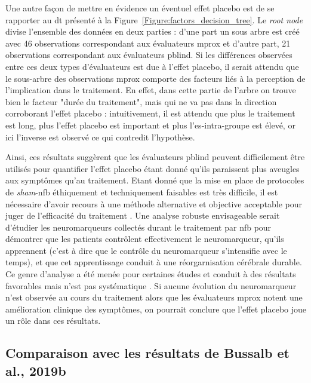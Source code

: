 Une autre façon de mettre en évidence un éventuel effet placebo est de se rapporter au \gls{dt} présenté à la Figure~\ref{Figure:factors_decision_tree}. Le 
\textit{root node} divise l'ensemble des données en deux parties : d'une part un sous arbre est créé avec 46 observations correspondant aux évaluateurs
\gls{mprox} et d'autre part, 21 observations correspondant aux évaluateurs \gls{pblind}. Si les différences observées entre ces deux types d'évaluateurs est due à l'effet
placebo, il serait attendu que le sous-arbre des observations \gls{mprox} comporte des facteurs liés à la perception de l'implication dans le traitement. En effet, dans cette
partie de l'arbre on trouve bien le facteur "durée du traitement", mais qui ne va pas dans la direction corroborant l'effet placebo : intuitivement, 
il est attendu que plus le traitement est long, plus l'effet placebo est important et plus l'\gls{es}-intra-groupe est élevé, or ici l'inverse est observé ce qui
contredit l'hypothèse. 

Ainsi, ces résultats suggèrent que les évaluateurs \gls{pblind} peuvent difficilement être utilisés pour quantifier l'effet placebo étant donné qu'ils paraissent
plus aveugles aux symptômes qu'au traitement. Etant donné que la mise en place de protocoles de \textit{sham}-\gls{nfb} éthiquement \citep{Holtmann2014} et techniquement 
\citep{Birbaumer1991} faisables est très difficile, il est nécessaire d'avoir recours à une méthode alternative et objective acceptable pour juger de l'efficacité du traitement 
\citep{World-Medical-Association2000}. Une analyse robuste envisageable serait d'étudier les neuromarqueurs collectés durant le traitement par \gls{nfb} pour démontrer que les 
patients contrôlent effectivement le neuromarqueur, qu'ils apprennent (c'est à dire que le contrôle du neuromarqueur s'intensifie avec le temps), et que cet apprentissage conduit 
à une réorgarnisation cérébrale durable. Ce genre d'analyse a été menée pour certaines études et conduit à des résultats favorables mais n'est pas 
systématique \citep{Arns2014}. Si aucune évolution du neuromarqueur n'est observée au cours du traitement alors que les évaluateurs \gls{mprox} notent une amélioration clinique 
des symptômes, on pourrait conclure que l'effet placebo joue un rôle dans ces résultats.

\subsection{Comparaison avec les résultats de Bussalb et al., 2019b}

